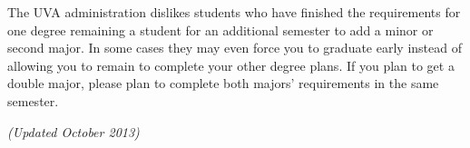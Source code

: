 The UVA administration dislikes students who have finished the
requirements for one degree remaining a student for an additional
semester to add a minor or second major. In some cases they may even
force you to graduate early instead of allowing you to remain to
complete your other degree plans. If you plan to get a double major,
please plan to complete both majors' requirements in the same
semester.




\begin{figure*}[h!]
{\em (Updated October 2013)}
\begin{center}
\end{center}
\end{figure*}
